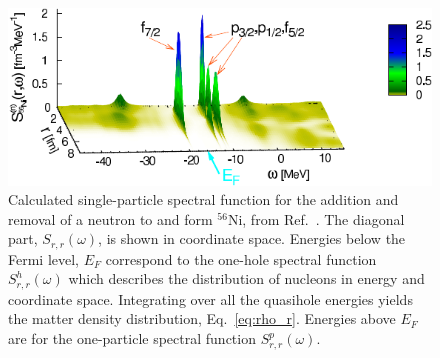 \begin{figure}[t]
\begin{center}
\includegraphics[height=0.38\textwidth]{Chapter11-figures/Fig_Ni56_SctFn.pdf}
\caption{
Calculated single-particle spectral function for the addition and removal of a neutron to and form $^{56}$Ni, from Ref.~\cite{ch11_Barbieri2009Ni}. The diagonal part, $S_{r,r}(\omega)$, is
shown in coordinate space. Energies below the Fermi level, $E_F$ correspond to the  one-hole spectral function $S^h_{r,r}(\omega)$  which describes
the distribution of nucleons in energy and coordinate space. Integrating over all the quasihole energies yields the matter  density distribution, Eq.~\eqref{eq:rho_r}.
Energies above $E_F$ are for the one-particle spectral function $S^p_{r,r}(\omega)$.}
\label{fig:ScptFnctN56}
\end{center}
\end{figure}

